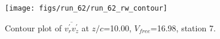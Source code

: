 \begin{figure}[H]
\centering
\texttt{[image: figs/run\_62/run\_62\_rw\_contour]}
\caption{Contour plot of $\overline{v_{r}^{\prime} v_{z}^{\prime}}$ at $z/c$=10.00, $V_{free}$=16.98, station 7.}
\label{fig:run_62_rw_contour}
\end{figure}


